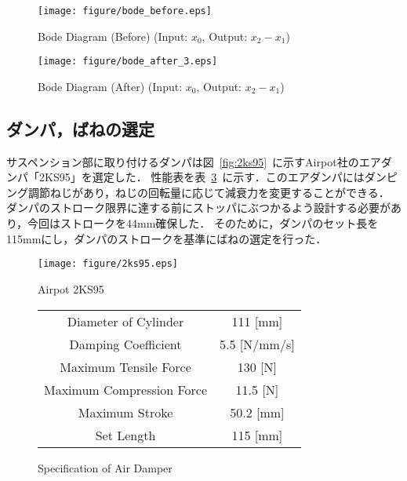 \documentclass[a4paper,12pt]{article_vdlab_sotsuron}
\begin{document}
\vspace{3mm}
\begin{figure}[h]
  \centering
   \texttt{[image: figure/bode\_before.eps]}
  \vspace{-2mm}
\caption{Bode Diagram (Before) (Input: $x_0$, Output: $x_2-x_1$)}
  \label{fig:bode_before}
\end{figure}
  \vspace{5mm}
\begin{figure}[h]
  \centering
   \texttt{[image: figure/bode\_after\_3.eps]}
  \vspace{-2mm}
\caption{Bode Diagram (After) (Input: $x_0$, Output: $x_2-x_1$)}
  \label{fig:bode_after}
\end{figure}



\newpage
\subsection{ダンパ，ばねの選定}
サスペンション部に取り付けるダンパは図~\ref{fig:2ks95}~に示すAirpot社のエアダンパ「2KS95」を選定した．
性能表を表~\ref{tab:2ks95}~に示す．このエアダンパにはダンピング調節ねじがあり，ねじの回転量に応じて減衰力を変更することができる．
ダンパのストローク限界に達する前にストッパにぶつかるよう設計する必要があり，今回はストロークを44mm確保した．
そのために，ダンパのセット長を115mmにし，ダンパのストロークを基準にばねの選定を行った．

\vspace*{15mm}
\begin{figure}[htp]
  \begin{minipage}{0.35\textwidth}
    \begin{center}
      \texttt{[image: figure/2ks95.eps]}
      \vspace*{3mm}
      \caption{Airpot 2KS95}
      \label{fig:2ks95}
    \end{center}
  \end{minipage}
  \begin{minipage}{0.6\textwidth}
      \begin{center}
	\makeatletter
	\def\@captype{table}
	\makeatother
	\caption{Specification of Air Damper}
	\label{tab:2ks95}
	  \begin{tabular}{cc}\hline
	    Diameter of Cylinder & 111 [mm] \\
	    Damping Coefficient & 5.5 [N/mm/s] \\
	    Maximum Tensile Force & 130 [N] \\
	    Maximum Compression Force & 11.5 [N] \\
	    Maximum Stroke & 50.2 [mm] \\
	    Set Length & 115 [mm] \\\hline
	  \end{tabular}
	\end{center}
  \end{minipage}
\end{figure}
\end{document}
